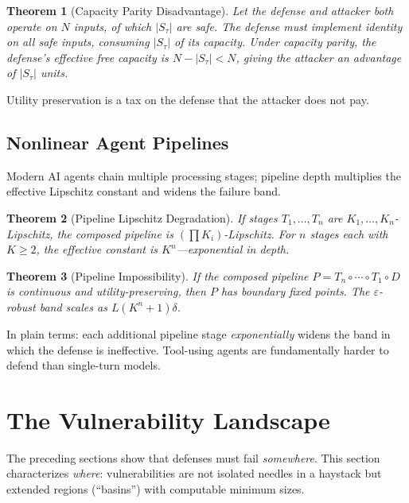 \documentclass[11pt]{article}
\newtheorem{theorem}{Theorem}[section]
\begin{document}
\begin{theorem}[Capacity Parity Disadvantage]
\label{thm:capacity}
Let the defense and attacker both operate on $N$ inputs, of which
$|S_\tau|$ are safe. The defense must implement identity on all safe
inputs, consuming $|S_\tau|$ of its capacity. Under capacity parity,
the defense's effective free capacity is $N - |S_\tau| < N$, giving
the attacker an advantage of $|S_\tau|$ units.
\end{theorem}

Utility preservation is a tax on the defense that the attacker does
not pay.

\subsection{Nonlinear Agent Pipelines}

Modern AI agents chain multiple processing stages; pipeline depth
multiplies the effective Lipschitz constant and widens the failure band.

\begin{theorem}[Pipeline Lipschitz Degradation]
\label{thm:pipeline}
If stages $T_1, \ldots, T_n$ are $K_1, \ldots, K_n$-Lipschitz, the
composed pipeline is $(\prod K_i)$-Lipschitz. For $n$ stages each with
$K \geq 2$, the effective constant is $K^n$---exponential in depth.
\end{theorem}

\begin{theorem}[Pipeline Impossibility]
\label{thm:pipeline-impossible}
If the composed pipeline $P = T_n \circ \cdots \circ T_1 \circ D$ is
continuous and utility-preserving, then $P$ has boundary fixed points.
The $\varepsilon$-robust band scales as $L(K^n + 1)\delta$.
\end{theorem}

In plain terms: each additional pipeline stage \emph{exponentially}
widens the band in which the defense is ineffective. Tool-using agents
are fundamentally harder to defend than single-turn models.


\section{The Vulnerability Landscape}
\label{sec:landscape}

The preceding sections show that defenses must fail \emph{somewhere}.
This section characterizes \emph{where}: vulnerabilities are not
isolated needles in a haystack but extended regions (``basins'') with
computable minimum sizes.
\end{document}
